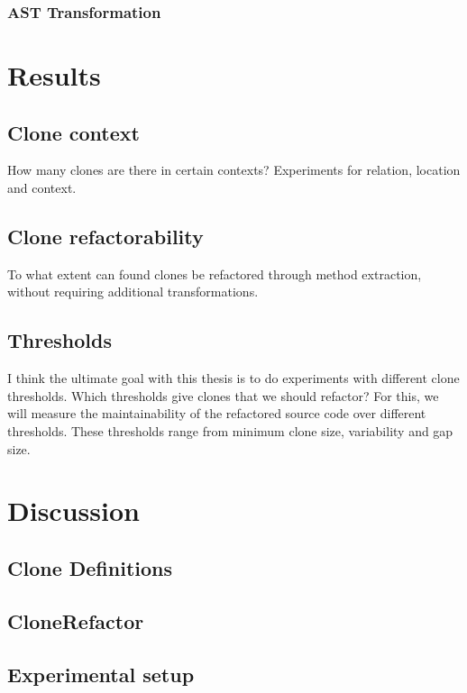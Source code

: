 \documentclass[sigconf,review]{acmart}
\begin{document}
\subsubsection{AST Transformation}


\section{Results}

\subsection{Clone context}
How many clones are there in certain contexts? Experiments for relation, location and context.

\subsection{Clone refactorability}
To what extent can found clones be refactored through method extraction, without requiring additional transformations.

\subsection{Thresholds}
I think the ultimate goal with this thesis is to do experiments with different clone thresholds. Which thresholds give clones that we should refactor? For this, we will measure the maintainability of the refactored source code over different thresholds. These thresholds range from minimum clone size, variability and gap size.

\section{Discussion}
\subsection{Clone Definitions}

\subsection{CloneRefactor}

\subsection{Experimental setup}
\end{document}
